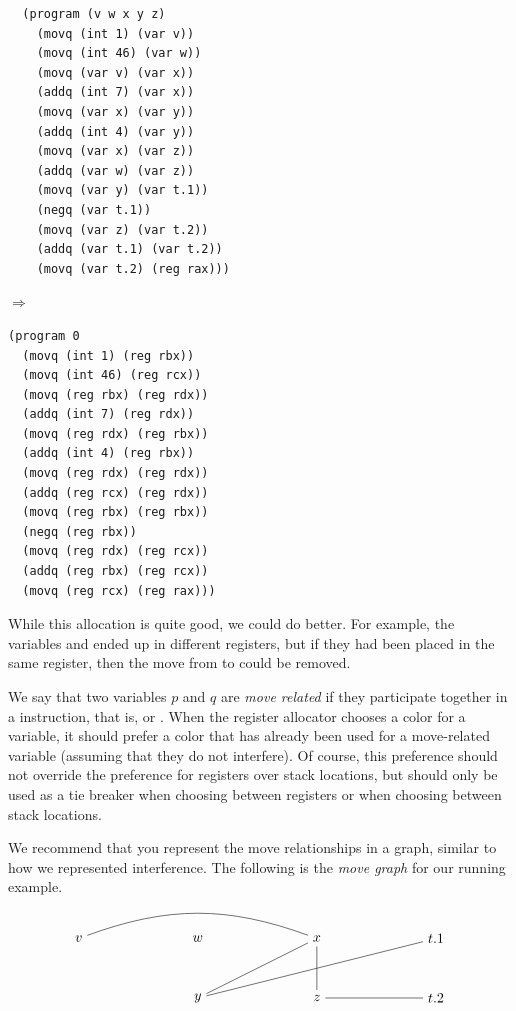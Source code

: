 \documentclass[11pt]{book}
\begin{document}
\begin{minipage}{0.45\textwidth}
\begin{lstlisting}
  (program (v w x y z)
    (movq (int 1) (var v))
    (movq (int 46) (var w))
    (movq (var v) (var x))
    (addq (int 7) (var x))
    (movq (var x) (var y))
    (addq (int 4) (var y))
    (movq (var x) (var z))
    (addq (var w) (var z))
    (movq (var y) (var t.1))
    (negq (var t.1))
    (movq (var z) (var t.2))
    (addq (var t.1) (var t.2))
    (movq (var t.2) (reg rax)))
\end{lstlisting}
\end{minipage}
$\Rightarrow$
\begin{minipage}{0.45\textwidth}
\begin{lstlisting}
(program 0
  (movq (int 1) (reg rbx))
  (movq (int 46) (reg rcx))
  (movq (reg rbx) (reg rdx))
  (addq (int 7) (reg rdx))
  (movq (reg rdx) (reg rbx))
  (addq (int 4) (reg rbx))
  (movq (reg rdx) (reg rdx))
  (addq (reg rcx) (reg rdx))
  (movq (reg rbx) (reg rbx))
  (negq (reg rbx))
  (movq (reg rdx) (reg rcx))
  (addq (reg rbx) (reg rcx))
  (movq (reg rcx) (reg rax)))
\end{lstlisting}
\end{minipage}

While this allocation is quite good, we could do better. For example,
the variables  and  ended up in different registers, but
if they had been placed in the same register, then the move from
 to  could be removed.

We say that two variables $p$ and $q$ are \emph{move related} if they
participate together in a  instruction, that is,  or . When the register allocator chooses a
color for a variable, it should prefer a color that has already been
used for a move-related variable (assuming that they do not
interfere). Of course, this preference should not override the
preference for registers over stack locations, but should only be used
as a tie breaker when choosing between registers or when choosing
between stack locations.

We recommend that you represent the move relationships in a graph,
similar to how we represented interference.  The following is the
\emph{move graph} for our running example.
\[
\begin{tikzpicture}[baseline=(current  bounding  box.center)]
\node (v) at (0,0)    {$v$};
\node (w) at (3,0)    {$w$};
\node (x) at (6,0)    {$x$};
\node (y) at (3,-1.5) {$y$};
\node (z) at (6,-1.5) {$z$};
\node (t1) at (9,0)   {$t.1$};
\node (t2) at (9,-1.5) {$t.2$};
\draw (t1) to (y);
\draw (t2) to (z);
\draw[bend left=20] (v) to (x);
\draw (x) to (y);
\draw (x) to (z);
\end{tikzpicture}
\]
\end{document}
